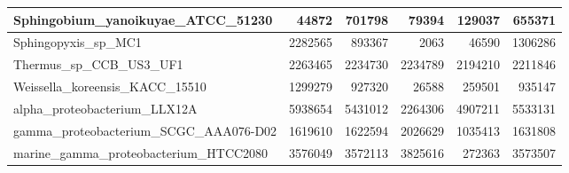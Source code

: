 \documentclass[12pt,a4paper]{article}
\begin{document}
\begin{table}[ht]
\begin{center}
\begin{tabular}{|l*{5}{|r}|}
Sphingobium\_yanoikuyae\_ATCC\_51230 & 44872 & 701798 & 79394 & 129037 & 655371 \\ \hline
Sphingopyxis\_sp\_MC1 & 2282565 & 893367 & 2063 & 46590 & 1306286 \\ \hline
Thermus\_sp\_CCB\_US3\_UF1 & 2263465 & 2234730 & 2234789 & 2194210 & 2211846 \\ \hline
Weissella\_koreensis\_KACC\_15510 & 1299279 & 927320 & 26588 & 259501 & 935147 \\ \hline
alpha\_proteobacterium\_LLX12A & 5938654 & 5431012 & 2264306 & 4907211 & 5533131 \\ \hline
gamma\_proteobacterium\_SCGC\_AAA076-D02 & 1619610 & 1622594 & 2026629 & 1035413 & 1631808 \\ \hline
marine\_gamma\_proteobacterium\_HTCC2080 & 3576049 & 3572113 & 3825616 & 272363 & 3573507 \\ \hline
\end{tabular}
\end{center}
\end{table}
\end{document}
